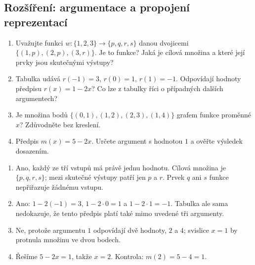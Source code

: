 \documentclass[11pt,a4paper]{article}
\begin{document}
\subsection*{Rozšíření: argumentace a propojení reprezentací}
\begin{zadaniReseniBox}
\begin{enumerate}[label=\alph*)]
\item Uvažujte funkci $w\colon\{1,2,3\}\to\{p,q,r,s\}$ danou dvojicemi $\{(1,p),(2,p),(3,r)\}$. Je to funkce? Jaká je cílová množina a které její prvky jsou skutečnými výstupy?
\item Tabulka udává $r(-1)=3$, $r(0)=1$, $r(1)=-1$. Odpovídají hodnoty předpisu $r(x)=1-2x$? Co lze z tabulky říci o případných dalších argumentech?
\item Je množina bodů $\{(0,1),(1,2),(2,3),(1,4)\}$ grafem funkce proměnné $x$? Zdůvodněte bez kreslení.
\item Předpis $m(x)=5-2x$. Určete argument s hodnotou $1$ a ověřte výsledek dosazením.
\end{enumerate}
\tcblower
\begin{enumerate}[label=\alph*)]
\item Ano, každý ze tří vstupů má právě jednu hodnotu. Cílová množina je $\{p,q,r,s\}$; mezi skutečné výstupy patří jen $p$ a $r$. Prvek $q$ ani $s$ funkce nepřiřazuje žádnému vstupu.
\item Ano: $1-2(-1)=3$, $1-2\cdot0=1$ a $1-2\cdot1=-1$. Tabulka ale sama nedokazuje, že tento předpis platí také mimo uvedené tři argumenty.
\item Ne, protože argumentu $1$ odpovídají dvě hodnoty, $2$ a $4$; svislice $x=1$ by protnula množinu ve dvou bodech.
\item Řešíme $5-2x=1$, takže $x=2$. Kontrola: $m(2)=5-4=1$.
\end{enumerate}
\end{zadaniReseniBox}
\end{document}
